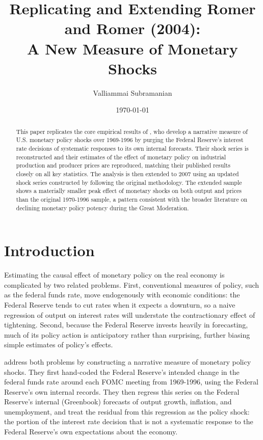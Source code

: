 \documentclass[11pt]{article}
\title{Replicating and Extending Romer and Romer (2004): \\ A New Measure of Monetary Shocks}
\author{Valliammai Subramanian}
\date{\today}
\begin{document}
\maketitle

\begin{abstract}
\noindent This paper replicates the core empirical results of \citet{romerromer2004}, who develop a narrative measure of U.S. monetary policy shocks over 1969-1996 by purging the Federal Reserve's interest rate decisions of systematic responses to its own internal forecasts. Their shock series is reconstructed and their estimates of the effect of monetary policy on industrial production and producer prices are reproduced, matching their published results closely on all key statistics. The analysis is then extended to 2007 using an updated shock series constructed by \citet{wielandyang2020} following the original methodology. The extended sample shows a materially smaller peak effect of monetary shocks on both output and prices than the original 1970-1996 sample, a pattern consistent with the broader literature on declining monetary policy potency during the Great Moderation.
\end{abstract}

\section{Introduction}

Estimating the causal effect of monetary policy on the real economy is complicated by two related problems. First, conventional measures of policy, such as the federal funds rate, move endogenously with economic conditions: the Federal Reserve tends to cut rates when it expects a downturn, so a naive regression of output on interest rates will understate the contractionary effect of tightening. Second, because the Federal Reserve invests heavily in forecasting, much of its policy action is anticipatory rather than surprising, further biasing simple estimates of policy's effects.

\citet{romerromer2004} address both problems by constructing a narrative measure of monetary policy shocks. They first hand-coded the Federal Reserve's intended change in the federal funds rate around each FOMC meeting from 1969-1996, using the Federal Reserve's own internal records. They then regress this series on the Federal Reserve's internal (Greenbook) forecasts of output growth, inflation, and unemployment, and treat the residual from this regression as the policy shock: the portion of the interest rate decision that is not a systematic response to the Federal Reserve's own expectations about the economy.
\end{document}
